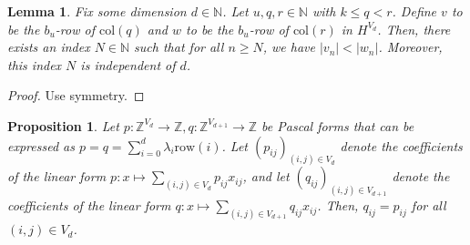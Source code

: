 \documentclass[11pt]{article}
\newtheorem{proposition}[theorem]{Proposition}
\newtheorem{lemma}[theorem]{Lemma}
\begin{document}
\begin{lemma}
  Fix some dimension $d \in \mathbb{N}$. Let $u, q,r \in \mathbb{N}$ with $k \leq q < r$. Define $v$ to be the $b_{u}$-row of $\mathrm{col}(q)$ and $w$ to be the $b_{u}$-row of $\mathrm{col}(r)$ in $H^{V_{d}}$. Then, there exists an index $N \in \mathbb{N}$ such that for all $n \geq N$, we have $\lvert v_{n} \rvert < \lvert w_{n} \rvert$. Moreover, this index $N$ is independent of $d$.
\end{lemma}

\begin{proof}
  Use symmetry.
\end{proof}

\begin{proposition}\label{prop:row_extend_d}
  Let \( p : \mathbb{Z}^{V_d} \to \mathbb{Z},  q: \mathbb{Z}^{V_{d+1}} \to \mathbb{Z}  \) be Pascal forms that can be expressed as \( p = q = \sum_{i=0}^{d}  \lambda_{i} \mathrm{row}(i) \). Let \( (p_{ij})_{(i,j) \in V_d} \) denote the coefficients of the linear form \( p: x \mapsto \sum_{(i,j) \in V_d} p_{ij}x_{ij} \), and let \( (q_{ij})_{(i,j) \in V_{d+1}} \) denote the coefficients of the linear form \( q: x \mapsto \sum_{(i,j) \in V_{d+1}} q_{ij}x_{ij} \). Then, \( q_{ij} = p_{ij} \) for all \( (i,j) \in V_d \).
  

\end{proposition}
\end{document}
